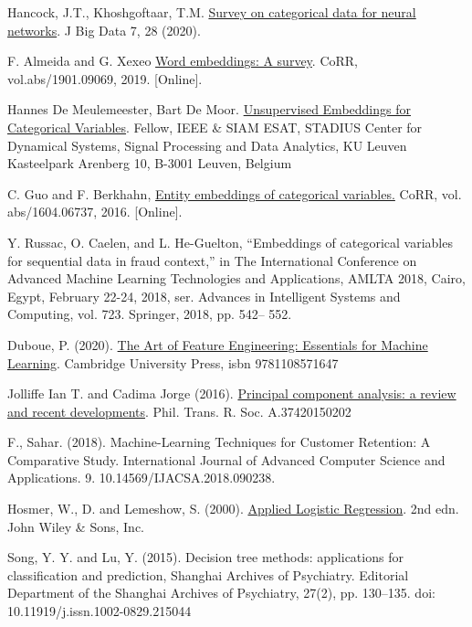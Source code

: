 \documentclass[LaM,binding=0.6cm, english]{sapthesis}
\begin{document}
\begin{thebibliography}{9}
Hancock, J.T., Khoshgoftaar, T.M. \href{https://doi.org/10.1186/s40537-020-00305-w}{Survey on categorical data for neural networks}. J Big Data 7, 28 (2020).

F. Almeida and G. Xexeo \href{http://arxiv.org/abs/1901.09069}{Word embeddings: A survey}. CoRR, vol.abs/1901.09069, 2019. [Online].

Hannes De Meulemeester, Bart De Moor. \href{ftp://ftp.esat.kuleuven.be/pub/SISTA//hdemeule/20-34.pdf}{Unsupervised Embeddings for Categorical Variables}. Fellow, IEEE \& SIAM ESAT, STADIUS Center for Dynamical Systems, Signal Processing and Data Analytics, KU Leuven Kasteelpark Arenberg 10, B-3001 Leuven, Belgium

C. Guo and F. Berkhahn, \href{https://arxiv.org/abs/1604.06737}{Entity embeddings of categorical
variables.} CoRR, vol. abs/1604.06737, 2016. [Online].

Y. Russac, O. Caelen, and L. He-Guelton, “Embeddings of categorical
variables for sequential data in fraud context,” in The International Conference on Advanced Machine Learning Technologies and Applications,
AMLTA 2018, Cairo, Egypt, February 22-24, 2018, ser. Advances in
Intelligent Systems and Computing, vol. 723. Springer, 2018, pp. 542–
552.

Duboue, P. (2020). \href{https://books.google.it/books?id=lLbrDwAAQBAJ}{The Art of Feature Engineering: Essentials for Machine Learning}. Cambridge University Press, isbn 9781108571647

Jolliffe Ian T. and Cadima Jorge (2016). \href{http://doi.org/10.1098/rsta.2015.0202}{Principal component analysis: a review and recent developments}. Phil. Trans. R. Soc. A.37420150202

F., Sahar. (2018). Machine-Learning Techniques for Customer Retention: A Comparative Study. International Journal of Advanced Computer Science and Applications. 9. 10.14569/IJACSA.2018.090238.

Hosmer, W., D. and Lemeshow, S. (2000). \href{http://resource.heartonline.cn/20150528/1_3kOQSTg.pdf}{Applied Logistic Regression}. 2nd edn. John Wiley \& Sons, Inc.

Song, Y. Y. and Lu, Y. (2015). Decision tree methods: applications for classification and prediction, Shanghai Archives of Psychiatry. Editorial Department of the Shanghai Archives of Psychiatry, 27(2), pp. 130–135. doi: 10.11919/j.issn.1002-0829.215044


\end{thebibliography}
\end{document}
